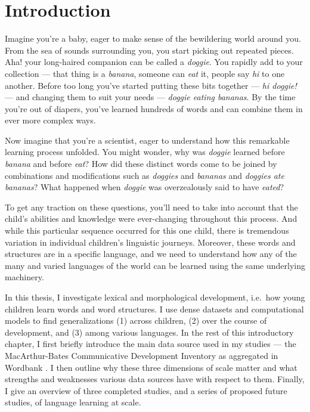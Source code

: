 \documentclass[
   11pt,
       ]{book}
\begin{document}
% 

{
\setcounter{tocdepth}{1}
\tableofcontents
}
\hypertarget{intro}{%
\chapter{Introduction}\label{intro}}

Imagine you're a baby, eager to make sense of the bewildering world around you. From the sea of sounds surrounding you, you start picking out repeated pieces. Aha! your long-haired companion can be called a \emph{doggie}. You rapidly add to your collection --- that thing is a \emph{banana}, someone can \emph{eat} it, people say \emph{hi} to one another. Before too long you've started putting these bits together --- \emph{hi doggie!} --- and changing them to suit your needs --- \emph{doggie eating bananas}. By the time you're out of diapers, you've learned hundreds of words and can combine them in ever more complex ways.

Now imagine that you're a scientist, eager to understand how this remarkable learning process unfolded. You might wonder, why was \emph{doggie} learned before \emph{banana} and before \emph{eat}? How did these distinct words come to be joined by combinations and modifications such as \emph{doggies} and \emph{bananas} and \emph{doggies ate bananas}? What happened when \emph{doggie} was overzealously said to have \emph{eated}?

To get any traction on these questions, you'll need to take into account that the child's abilities and knowledge were ever-changing throughout this process. And while this particular sequence occurred for this one child, there is tremendous variation in individual children's linguistic journeys. Moreover, these words and structures are in a specific language, and we need to understand how any of the many and varied languages of the world can be learned using the same underlying machinery.

In this thesis, I investigate lexical and morphological development, i.e.~how young children learn words and word structures. I use dense datasets and computational models to find generalizations (1) across children, (2) over the course of development, and (3) among various languages. In the rest of this introductory chapter, I first briefly introduce the main data source used in my studies --- the MacArthur-Bates Communicative Development Inventory \citep{fenson2007} as aggregated in Wordbank \citep{frank2017}. I then outline why these three dimensions of scale matter and what strengths and weaknesses various data sources have with respect to them. Finally, I give an overview of three completed studies, and a series of proposed future studies, of language learning at scale.
\end{document}
